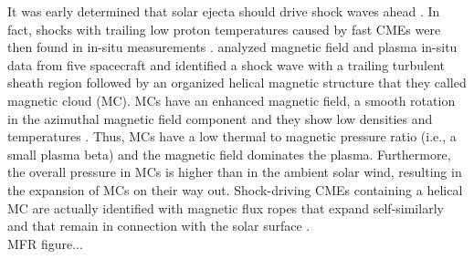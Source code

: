 It was early determined that solar ejecta should drive shock waves ahead \citep{Gold1962}. In fact, shocks with trailing low proton temperatures caused by fast CMEs were then found in in-situ measurements \citep{Gosling1973,Gosling1974}. \citet{Burlaga1981} analyzed magnetic field and plasma in-situ data from five spacecraft and identified a shock wave with a trailing turbulent sheath region followed by an organized helical magnetic structure that they called magnetic cloud (MC). MCs have an enhanced magnetic field, a smooth rotation in the azimuthal magnetic field component and they show low densities and temperatures \citep{Burlaga1981}. Thus, MCs have a low thermal to magnetic pressure ratio (i.e., a small plasma beta) and the magnetic field dominates the plasma. Furthermore, the overall pressure in MCs is higher than in the ambient solar wind, resulting in the expansion of MCs on their way out. Shock-driving CMEs containing a helical MC are actually identified with magnetic flux ropes that expand self-similarly and that remain in connection with the solar surface \citep{Chen1997}.\\

MFR figure...\\

